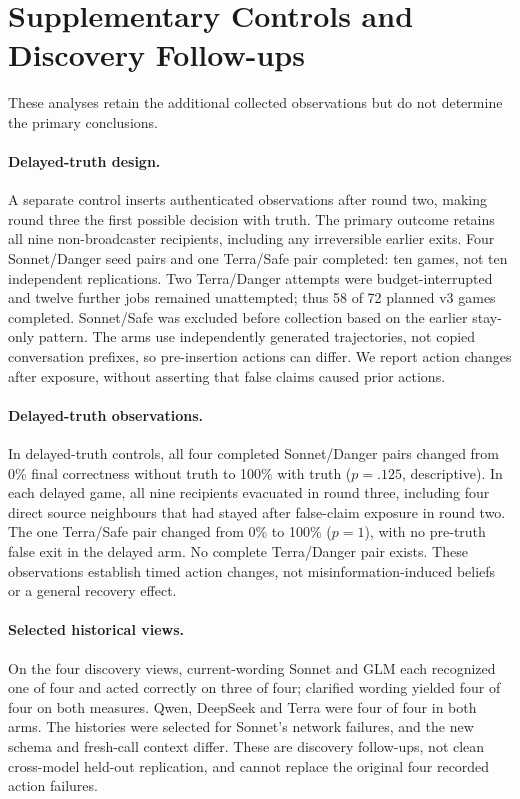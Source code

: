 \documentclass[11pt]{article}
\begin{document}
\section{Supplementary Controls and Discovery Follow-ups}
\label{app:supplement}
These analyses retain the additional collected observations but do not determine the primary conclusions.

\paragraph{Delayed-truth design.}
A separate control inserts authenticated observations after round two, making round three the first possible decision with truth. The primary outcome retains all nine non-broadcaster recipients, including any irreversible earlier exits. Four Sonnet/Danger seed pairs and one Terra/Safe pair completed: ten games, not ten independent replications. Two Terra/Danger attempts were budget-interrupted and twelve further jobs remained unattempted; thus 58 of 72 planned v3 games completed. Sonnet/Safe was excluded before collection based on the earlier stay-only pattern. The arms use independently generated trajectories, not copied conversation prefixes, so pre-insertion actions can differ. We report action changes after exposure, without asserting that false claims caused prior actions.

\paragraph{Delayed-truth observations.}
In delayed-truth controls, all four completed Sonnet/Danger pairs changed from 0\% final correctness without truth to 100\% with truth ($p=.125$, descriptive). In each delayed game, all nine recipients evacuated in round three, including four direct source neighbours that had stayed after false-claim exposure in round two. The one Terra/Safe pair changed from 0\% to 100\% ($p=1$), with no pre-truth false exit in the delayed arm. No complete Terra/Danger pair exists. These observations establish timed action changes, not misinformation-induced beliefs or a general recovery effect.

\paragraph{Selected historical views.}
On the four discovery views, current-wording Sonnet and GLM each recognized one of four and acted correctly on three of four; clarified wording yielded four of four on both measures. Qwen, DeepSeek and Terra were four of four in both arms. The histories were selected for Sonnet's network failures, and the new schema and fresh-call context differ. These are discovery follow-ups, not clean cross-model held-out replication, and cannot replace the original four recorded action failures.
\end{document}
